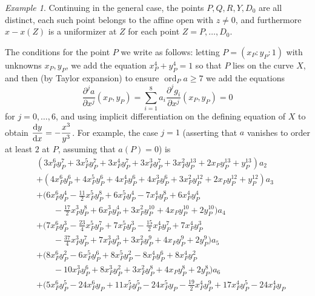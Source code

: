 \documentclass{amsproc}
\numberwithin{equation}{section}
\numberwithin{figure}{section}
\theoremstyle{definition}
\theoremstyle{remark}
\newtheorem{example}[equation]{Example}
\DeclareMathOperator{\ord}{ord}
\renewcommand{\geq}{\geqslant}
\begin{document}
\begin{example}
Continuing in the general case, the points $P,Q,R,Y,D_{0}$ are all distinct, each such point belongs to the affine open with $z \neq 0$, and furthermore $x-x(Z)$ is a uniformizer at $Z$ for each point $Z=P,\dots,D_{0}$.  

The conditions for the point $P$ we write as follows: letting $P=(x_{P}:y_{P}:1)$ with unknowns $x_{P},y_{P}$, we add the equation $x_{P}^4+y_{P}^4=1$ so that $P$ lies on the curve $X$, and then (by Taylor expansion) to ensure $\ord_{P} a \geq 7$ we add the equations 
\begin{equation} 
\frac{\partial^j a}{\partial x^j}(x_{P},y_{P}) = \sum_{i=1}^8 a_i \frac{\partial^j g_i}{\partial x^j}(x_{P},y_{P}) = 0
\end{equation}
for $j=0,\dots,6$, and using implicit differentiation on the defining equation of $X$ to obtain $\displaystyle{\frac{\textup{d}y}{\textup{d}x}}=-\frac{x^3}{y^3}$.  For example, the case $j=1$ (asserting that $a$ vanishes to order at least $2$ at $P$, assuming that $a(P)=0$) is 
\begin{equation}
\begin{aligned}
&(3x_{P}^6y_{P}^7 + 3x_{P}^5y_{P}^7 + 3x_{P}^4y_{P}^7 + 3x_{P}^3y_{P}^7 + 3x_{P}^2y_{P}^{13} + 2x_{P}y_{P}^{13} + y_{P}^{13})a_2 \\
    & + (4x_{P}^6y_{P}^6 + 4x_{P}^5y_{P}^6 + 4x_{P}^4y_{P}^6
    + 4x_{P}^3y_{P}^6 + 3x_{P}^2y_{P}^{12} + 2x_{P}y_{P}^{12} + y_{P}^{12})a_3 \\
    &+ 
    (6x_{P}^6y_{P}^4 - \tfrac{11}{2}x_{P}^5y_{P}^8 + 6x_{P}^5y_{P}^4 - 7x_{P}^4y_{P}^8 + 
    6x_{P}^4y_{P}^4  \\
    &\qquad - \tfrac{17}{2}x_{P}^3y_{P}^8 + 6x_{P}^3y_{P}^4 + 3x_{P}^2y_{P}^{10} + 
    4x_{P}y_{P}^{10} + 2y_{P}^{10})a_4 \\
    &+ (7x_{P}^6y_{P}^3 - \tfrac{23}{4}x_{P}^5y_{P}^7 + 
    7x_{P}^5y_{P}^3 - \tfrac{15}{2}x_{P}^4y_{P}^7 + 7x_{P}^4y_{P}^3  \\
    &\qquad - \tfrac{37}{4}x_{P}^3y_{P}^7 + 
    7x_{P}^3y_{P}^3 + 3x_{P}^2y_{P}^9 + 4x_{P}y_{P}^9 + 2y_{P}^9)a_5  \\
    &+ (8x_{P}^6y_{P}^2 - 6x_{P}^5y_{P}^6 + 8x_{P}^5y_{P}^2 - 8x_{P}^4y_{P}^6 + 8x_{P}^4y_{P}^2 \\ 
    &\qquad - 10x_{P}^3y_{P}^6 + 8x_{P}^3y_{P}^2 + 3x_{P}^2y_{P}^8 + 4x_{P}y_{P}^8 + 2y_{P}^8)a_6 \\
    &+
    (5x_{P}^6y_{P}^5 - 24x_{P}^6y_{P} + 11x_{P}^5y_{P}^5 - 24x_{P}^5y_{P} - 
    \tfrac{19}{2}x_{P}^4y_{P}^9 + 17x_{P}^4y_{P}^5 - 24x_{P}^4y_{P} \\

\end{aligned}
\end{equation}
\end{example}
\end{document}
